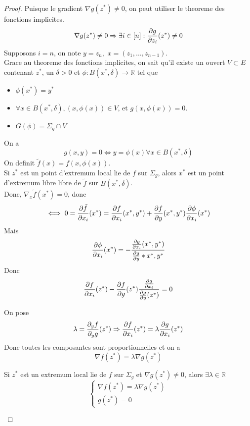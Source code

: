 \documentclass[../main.tex]{subfiles}
\begin{document}
\begin{proof}
	Puisque le gradient $\nabla g( z^{*}) \neq 0$, on peut utiliser le theoreme des fonctions implicites.
	\[ 
		\nabla g ( z^{*}) \neq 0 \Rightarrow \exists i \in  [ n] : \frac{\partial g }{\partial z_i}( z^{*}) \neq 0
	\]
	Supposons $i=n $, on note $y=z_n,$ $x= ( z_1,\ldots,z_{n-1} ) $.\\
	Grace au theoreme des fonctions implicites, on sait qu'il existe un ouvert $V \subset E$ contenant $z^{*}$, un $\delta >0$ et $\phi: B( x^{*},\delta) \to \mathbb{R}$ tel que
	\begin{itemize}
		\item $\phi( x^{*}) =y^{*}$ 
		\item $\forall x \in B( x^{*},\delta) , ( x,\phi( x) ) \in V$, et $g( x,\phi( x) ) =0$.
		\item $G( \phi) = \Sigma_g \cap V$
	\end{itemize}
On a 
\[ 
	g( x,y) =0 \iff y = \phi( x) \forall x \in B( x^{*},\delta) 
\]
On definit $\tilde f( x) = f( x,\phi( x) ) $.\\
Si $z^{*}$ est un point d'extremum local lie de $f$ sur $\Sigma_g$, alors $x^{*}$ est un point d'extremum libre libre de $\tilde f$ sur $B( x^{*},\delta) $.\\
Donc, $\nabla_x \tilde f( x^{*}) =0$, donc
\begin{align*}
	\iff 0= \frac{\partial \tilde f}{\partial x_i}( x^{*}) = \frac{\partial f}{\partial x_i}( x^{*},y^{*}) + \frac{\partial f}{\partial y}( x^{*},y^{*}) \frac{\partial \phi}{\partial x_i  }( x^{*}) 
\end{align*}
Mais 
\[ 
	\frac{\partial \phi}{\partial x_i} ( x^{*}) = - \frac{ \frac{\partial g}{\partial x_i}( x^{*},y^{*}) }{\frac{\partial g}{\partial y}*x^{*},y^{*}}
\]
Donc
\[ 
	\frac{\partial f}{\partial x_i}( z^{*}) - \frac{\partial f}{\partial g}( z^{*})  \frac{ \frac{\partial g}{\partial x_i }}{\frac{\partial g}{\partial y }( z^{*}) }=0
\]

On pose
\[ 
	\lambda = \frac{ \partial_y f}{\partial_y g}( z^{*})  \Rightarrow \frac{\partial f}{\partial x_i}( z^{*}) = \lambda \frac{\partial g}{\partial x_i}( z^{*}) 
\]
Donc toutes les composantes sont proportionnelles et on a
\[ 
	\nabla f ( z^{*}) = \lambda \nabla g( z^{*}) 
\]
\begin{rmq}
	Si $z^{*}$ est un extremum local lie de $f$ sur $\Sigma_g$ et $\nabla g ( z^{*}) \neq 0$, alors $\exists \lambda \in \mathbb{R}$ 
	\[ 
		\begin{cases}
		\nabla f( z^{*}) =\lambda \nabla g( z^{*}) \\
g( z^{*}) =0
		\end{cases}
	\]


\end{rmq}
\end{proof}
\end{document}

